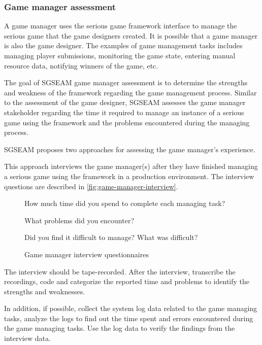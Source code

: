 \subsubsection{Game manager assessment}

A game manager uses the serious game framework interface to manage the serious game that the game
designers created. It is possible that a game manager is also the game designer.
The examples of game management tasks includes managing player submissions, monitoring the game 
state, entering manual resource data, notifying winners of the game, etc.

The goal of SGSEAM game manager assessment is to determine the strengths and weakness of the framework 
regarding the game management process. Similar to the assessment of the game designer, SGSEAM assesses 
the game manager stakeholder regarding the time it required to manage an instance of a serious game using the framework
and the problems encountered during the managing process.

SGSEAM proposes two approaches for assessing the game manager's experience.

\label{Post-hoc game manager interview}

This approach interviews the game manager(s) after they have finished managing a serious game using the framework 
in a production environment. The interview questions are described in \autoref{fig:game-manager-interview}.
 
\begin{figure}[ht!]
\begin{mybox}
\begin{compactenum}
\item How much time did you spend to complete each managing task?
\item What problems did you encounter?
\item Did you find it difficult to manage? What was difficult?
\end{compactenum}
\end{mybox}
\caption{Game manager interview questionnaires}
\label{fig:game-manager-interview}  
\end{figure}

The interview should be tape-recorded. After the interview, transcribe the recordings, code and categorize the reported 
time and problems to identify the strengths and weaknesses.

In addition, if possible, collect the system log data related to the game managing tasks, analyze the logs to find out the time 
spent and errors encountered during the game managing tasks. Use the log data to verify the findings from the interview data.

